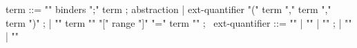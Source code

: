 \begin{syntax}
term ::= "\lambda" binders ";" term ; abstraction
| ext-quantifier "(" term "," term "," term ")" ;
| { "{" term "\with" "[" range "]" "=" term "}" } ;
\
ext-quantifier ::= { "\max" } | { "\min" } | "\sum" ;
                 | "\product" | "\numof"
\end{syntax}
